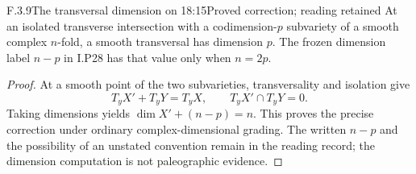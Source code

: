 \begin{result}{F.3.9}{The transversal dimension on 18:15}{Proved correction; reading retained}
At an isolated transverse intersection with a codimension-$p$ subvariety of a smooth complex $n$-fold, a smooth transversal has dimension $p$. The frozen dimension label $n-p$ in I.P28 has that value only when $n=2p$.
\end{result}
\begin{proof}
At a smooth point of the two subvarieties, transversality and isolation give
\[
 T_yX'+T_yY=T_yX,\qquad T_yX'\cap T_yY=0.
\]
Taking dimensions yields $\dim X'+(n-p)=n$. This proves the precise correction under ordinary complex-dimensional grading. The written $n-p$ and the possibility of an unstated convention remain in the reading record; the dimension computation is not paleographic evidence.
\end{proof}

